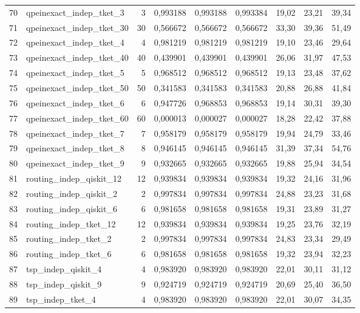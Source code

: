\documentclass[a4paper,10pt]{article}
\begin{document}
\begin{landscape}
\begin{longtable}{r l r rrr rrr}
70 & qpeinexact\_indep\_tket\_3 & 3 & 0,993188 & 0,993188 & 0,993384 & 19,02 & 23,21 & 39,34\\
71 & qpeinexact\_indep\_tket\_30 & 30 & 0,566672 & 0,566672 & 0,566672 & 33,30 & 39,36 & 51,49\\
72 & qpeinexact\_indep\_tket\_4 & 4 & 0,981219 & 0,981219 & 0,981219 & 19,10 & 23,46 & 29,64\\
73 & qpeinexact\_indep\_tket\_40 & 40 & 0,439901 & 0,439901 & 0,439901 & 26,06 & 31,97 & 47,53\\
74 & qpeinexact\_indep\_tket\_5 & 5 & 0,968512 & 0,968512 & 0,968512 & 19,13 & 23,48 & 37,62\\
75 & qpeinexact\_indep\_tket\_50 & 50 & 0,341583 & 0,341583 & 0,341583 & 20,88 & 26,88 & 41,84\\
76 & qpeinexact\_indep\_tket\_6 & 6 & 0,947726 & 0,968853 & 0,968853 & 19,14 & 30,31 & 39,30\\
77 & qpeinexact\_indep\_tket\_60 & 60 & 0,000013 & 0,000027 & 0,000027 & 18,28 & 22,42 & 37,88\\
78 & qpeinexact\_indep\_tket\_7 & 7 & 0,958179 & 0,958179 & 0,958179 & 19,94 & 24,79 & 33,46\\
79 & qpeinexact\_indep\_tket\_8 & 8 & 0,946145 & 0,946145 & 0,946145 & 31,39 & 37,34 & 54,76\\
80 & qpeinexact\_indep\_tket\_9 & 9 & 0,932665 & 0,932665 & 0,932665 & 19,88 & 25,94 & 34,54\\
81 & routing\_indep\_qiskit\_12 & 12 & 0,939834 & 0,939834 & 0,939834 & 19,32 & 24,16 & 31,96\\
82 & routing\_indep\_qiskit\_2 & 2 & 0,997834 & 0,997834 & 0,997834 & 24,88 & 23,23 & 31,68\\
83 & routing\_indep\_qiskit\_6 & 6 & 0,981658 & 0,981658 & 0,981658 & 19,31 & 23,89 & 31,27\\
84 & routing\_indep\_tket\_12 & 12 & 0,939834 & 0,939834 & 0,939834 & 19,25 & 23,76 & 32,19\\
85 & routing\_indep\_tket\_2 & 2 & 0,997834 & 0,997834 & 0,997834 & 24,83 & 23,34 & 29,49\\
86 & routing\_indep\_tket\_6 & 6 & 0,981658 & 0,981658 & 0,981658 & 19,32 & 23,94 & 32,23\\
87 & tsp\_indep\_qiskit\_4 & 4 & 0,983920 & 0,983920 & 0,983920 & 22,01 & 30,11 & 31,12\\
88 & tsp\_indep\_qiskit\_9 & 9 & 0,924719 & 0,924719 & 0,924719 & 20,69 & 25,40 & 36,50\\
89 & tsp\_indep\_tket\_4 & 4 & 0,983920 & 0,983920 & 0,983920 & 22,01 & 30,07 & 34,35\\

\end{longtable}
\end{landscape}
\end{document}
